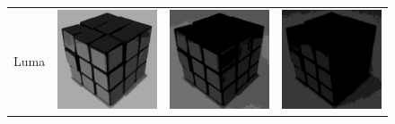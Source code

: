 \begin{figure}
\begin{tabular}{rccc}
         Luma &
         \includegraphics[width=\rubiklength]{img/rubik/1_yuv_y.jpg} & 
         \includegraphics[width=\rubiklength]{img/rubik/2_yuv_y.jpg} &
         \includegraphics[width=\rubiklength]{img/rubik/3_yuv_y.jpg}\\
         

\end{tabular}
\end{figure}
